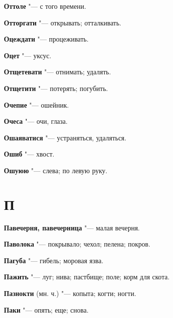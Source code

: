\begin{mymulticols}{2}
\noindent\textbf{Оттоле} "--- с того времени. 




\noindent\textbf{Отторгати} "--- открывать; отталкивать. 




\noindent\textbf{Оцеждати} "--- процеживать. 




\noindent\textbf{Оцет} "--- уксус. 




\noindent\textbf{Отщетевати} "--- отнимать; удалять. 




\noindent\textbf{Отщетити} "--- потерять; погубить. 




\noindent\textbf{Очепие} "--- ошейник. 




\noindent\textbf{Очеса} "--- очи, глаза. 




\noindent\textbf{Ошаяватися} "--- устраняться, удаляться. 




\noindent\textbf{Ошиб} "--- хвост. 




\noindent\textbf{Ошуюю} "--- слева; по левую руку. 




\section{П}





\noindent\textbf{Павечерня, павечерница} "--- малая вечерня. 




\noindent\textbf{Паволока} "--- покрывало; чехол; пелена; покров. 




\noindent\textbf{Пагуба} "--- гибель; моровая язва. 




\noindent\textbf{Пажить} "--- луг; нива; пастбище; поле; корм для скота. 




\noindent\textbf{Пазнокти} (мн. ч.) "--- копыта; когти; ногти. 




\noindent\textbf{Паки} "--- опять; еще; снова. 





\end{mymulticols}
